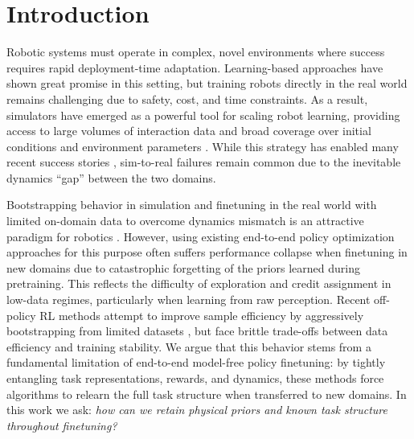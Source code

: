 \section{Introduction}

Robotic systems must operate in complex, novel environments where success requires rapid deployment-time adaptation. Learning-based approaches \cite{intelligence2025pi,JMLR:v17:15-522, kim2024openvla} have shown great promise in this setting, but training robots directly in the real world remains challenging due to safety, cost, and time constraints.  As a result, simulators have emerged as a powerful tool for scaling robot learning, providing access to large volumes of interaction data and broad coverage over initial conditions and environment parameters \cite{rudin2022learning, yin2026emergent, narang2022factory}. While this strategy has enabled many recent success stories \cite{lee2020learning, kumar2021rma, singh2024dextrah}, sim-to-real failures remain common due to the inevitable dynamics ``gap'' between the two domains.

Bootstrapping behavior in simulation and finetuning in the real world with limited on-domain data to overcome dynamics mismatch is an attractive paradigm for robotics \cite{smith2022legged, yin2025rapidly,westenbroek2022lyapunovdesignrobustefficient,wagenmaker2024overcoming}. However, using existing end-to-end policy optimization approaches for this purpose often suffers performance collapse when finetuning in new domains \cite{zhou2024efficient, yin2025rapidly} due to catastrophic forgetting of the priors learned during pretraining. This reflects the difficulty of exploration and credit assignment in low-data regimes, particularly when learning from raw perception. Recent off-policy RL methods attempt to improve sample efficiency by aggressively bootstrapping from limited datasets \cite{rlpd, redq, droq, serl}, but face brittle trade-offs between data efficiency and training stability. We argue that this behavior stems from a fundamental limitation of end-to-end model-free policy finetuning: by tightly entangling task representations, rewards, and dynamics, these methods force algorithms to relearn the full task structure when transferred to new domains. In this work we ask: \emph{how can we retain physical priors and known task structure throughout finetuning?} 


